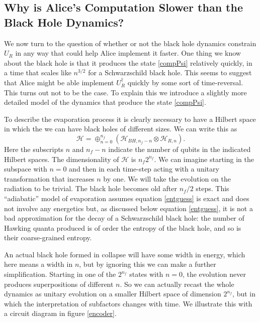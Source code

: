 \documentclass[12pt]{article}
\newcommand{\be}{\begin{equation}}
\newcommand{\ee}{\end{equation}}
\begin{document}
\subsection{Why is Alice's Computation Slower than the Black Hole Dynamics?}\label{slowcomp}
We now turn to the question of whether or not the black hole dynamics constrain $U_R$ in any way that could help Alice implement it faster.  One thing we know about the black hole is that it produces the state \eqref{compPsi} relatively quickly, in a time that scales like $n^{3/2}$ for a Schwarzschild black hole.  This seems to suggest that Alice might be able implement $U_R^\dagger$ quickly by some sort of time-reversal.  This turns out not to be the case.  To explain this we introduce a slightly more detailed model of the dynamics that produce the state \eqref{compPsi}.  

To describe the evaporation process it is clearly necessary to have a Hilbert space in which the we can have black holes of different sizes.  We can write this as
\be
\mathcal{H}=\oplus_{n=0}^{n_f}\left(\mathcal{H}_{BH,n_f-n}\otimes \mathcal{H}_{R,n}\right).
\ee
Here the subscripts $n$ and $n_f-n$ indicate the number of qubits in the indicated Hilbert spaces.  The dimensionality of $\mathcal{H}$ is $n_f 2^{n_f}$.  We can imagine starting in the subspace with $n=0$ and then in each time-step acting with a unitary transformation that increases $n$ by one.  We will take the evolution on the radiation to be trivial.  The black hole becomes old after $n_f/2$ steps.  This ``adiabatic'' model of evaporation assumes equation \eqref{entguess} is exact and does not involve any energetics but, as discussed below equation \eqref{entguess}, it is not a bad approximation for the decay of a Schwarzschild black hole: the number of Hawking quanta produced is of order the entropy of the black hole, and so is their coarse-grained entropy.  

An actual black hole formed in collapse will have some width in energy, which here means a width in $n$, but by ignoring this we can make a further simplification.  Starting in one of the $2^{n_f}$ states with $n=0$, the evolution never produces superpositions of different $n$.  So we can actually recast the whole dynamics as unitary evolution on a smaller Hilbert space of dimension $2^{n_f}$, but in which the interpretation of subfactors changes with time.  We illustrate this with a circuit diagram in figure \ref{encoder}.
\end{document}
